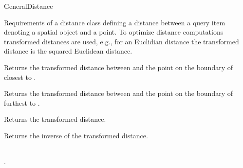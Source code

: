 

\begin{ccRefConcept}{GeneralDistance}


\ccDefinition

Requirements of a distance class defining a distance between a query item
denoting a spatial object and a point.
To optimize distance computations transformed distances are used,
e.g., for an Euclidian distance the transformed distance is the squared Euclidean distance.


\ccTypes



\ccOperations


{Returns the transformed distance between  and
the point on the boundary of  closest to .}

{Returns the transformed distance between  and
the point on the boundary of  furthest to .}

 {Returns the transformed distance.}

 {Returns the inverse of the transformed distance.}

\ccHasModels

\\
.



\end{ccRefConcept}


